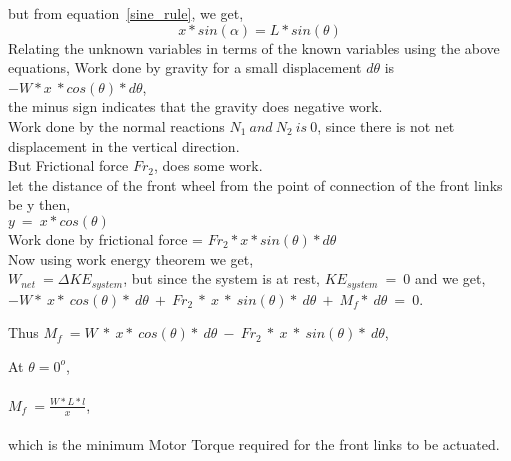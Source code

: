 but from equation~\ref{sine_rule}, we get,
\begin{equation}
    x * sin(\alpha) = L * sin(\theta)
\end{equation}
Relating the unknown variables in terms of the known variables using the above equations,  
Work done by gravity for a small displacement $d\theta$ is $-W * x \ *cos(\theta) * d\theta$,\\
the minus sign indicates that the gravity does negative work.\\
Work done by the normal reactions $N_1 \ and \ N_2 \ is \ 0$, since there is not net displacement in the vertical direction.\\
But Frictional force $Fr_{2}$, does some work.\\
let the distance of the front wheel from the point of connection of the front links be y then,\\
$y \ = \ x * cos(\theta)$\\
Work done by frictional force  = $Fr_{2} * x * sin(\theta)*d\theta$\\
Now using work energy theorem we get,\\ $W_{net} \ = \Delta KE_{system}$,
 but since the system is at rest,  
$ KE_{system} \ = \ 0 $
and we get,\\
$ -W * \ x  * \ cos(\theta) * \ d\theta \ + \ Fr_{2} \ * \ x \ * \ sin(\theta)* \ d\theta \ + \ M_{f} * \ d\theta \ = \ 0 $.

Thus $M_{f} \ = W \ * \ x  * \ cos(\theta) * \ d\theta \ - \ Fr_{2} \ * \ x \ * \ sin(\theta)* \ d\theta$,

At $\theta = 0 ^ o$,\\ \\
$M_{f} \ = \frac{W*L*l}{x}$,\\ \\
which is the minimum Motor Torque required for the front links to be actuated.

